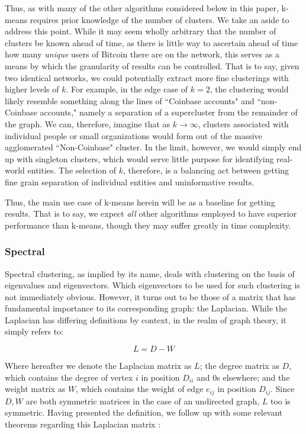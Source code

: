 \documentclass{article}
\begin{document}
Thus, as with many of the other algorithms considered below in this paper, k-means requires prior knowledge of the number of clusters. We take an aside to address this point. While it may seem wholly arbitrary that the number of clusters be known ahead of time, as there is little way to ascertain ahead of time how many \textit{unique} users of Bitcoin there are on the network, this serves as a means by which the granularity of results can be controlled. That is to say, given two identical networks, we could potentially extract more fine clusterings with higher levels of $k$. For example, in the edge case of $k=2$, the clustering would likely resemble something along the lines of ``Coinbase accounts" and ``non-Coinbase accounts," namely a separation of a supercluster from the remainder of the graph. We can, therefore, imagine that as $k\rightarrow\infty$, clusters associated with individual people or small organizations would form out of the massive agglomerated ``Non-Coinbase" cluster. In the limit, however, we would simply end up with singleton clusters, which would serve little purpose for identifying real-world entities. The selection of $k$, therefore, is a balancing act between getting fine grain separation of individual entities and uninformative results.

Thus, the main use case of k-means herein will be as a baseline for getting results. That is to say, we expect \textit{all} other algorithms employed to have superior performance than k-means, though they may suffer greatly in time complexity.

\subsubsection{Spectral}\label{spectral-bg}
Spectral clustering, as implied by its name, deals with clustering on the basis of eigenvalues and eigenvectors. Which eigenvectors to be used for such clustering is not immediately obvious. However, it turns out to be those of a matrix that has fundamental importance to its corresponding graph: the Laplacian. While the Laplacian has differing definitions by context, in the realm of graph theory, it simply refers to:

$$ L = D-W $$

Where hereafter we denote the Laplacian matrix as $L$; the degree matrix as $D$, which contains the degree of vertex $i$ in position $D_{ii}$ and 0s elsewhere; and the weight matrix as $W$, which contains the weight of edge $e_{ij}$ in position $D_{ij}$. Since $D,W$ are both symmetric matrices in the case of an undirected graph, $L$ too is symmetric. Having presented the definition, we follow up with some relevant theorems regarding this Laplacian matrix \cite{spectral}:
\end{document}
